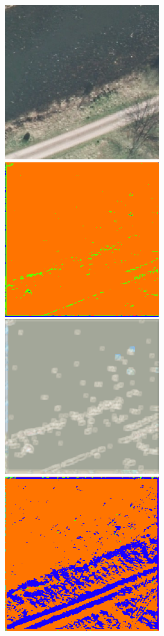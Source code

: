 \begin{figure}
    \vspace{2mm}
    \includegraphics[width=\WnetPredictionsImageWidth]{images/wnet/original/78905-image} \hfill
    \includegraphics[width=\WnetPredictionsImageWidth]{images/wnet/36d-6/78905-prediction} \hfill
    \includegraphics[width=\WnetPredictionsImageWidth]{images/wnet/36d-6/78905-restored} \hfill
    \includegraphics[width=\WnetPredictionsImageWidth]{images/wnet/46d-6/78905-prediction} \hfill

\end{figure}
